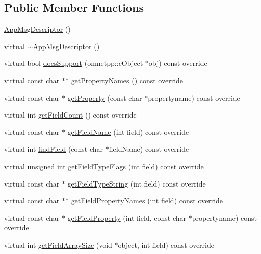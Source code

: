 \subsection*{Public Member Functions}
\begin{DoxyCompactItemize}
\item 
\hyperlink{classAppMsgDescriptor_a6db2ddcf43396f5c9f97311e757e3b51}{App\+Msg\+Descriptor} ()
\item 
virtual \hyperlink{classAppMsgDescriptor_ab164a07b536b9fba949565b8717dc502}{$\sim$\+App\+Msg\+Descriptor} ()
\item 
virtual bool \hyperlink{classAppMsgDescriptor_a46278424168df1b1c695931d232903aa}{does\+Support} (omnetpp\+::c\+Object $\ast$obj) const override
\item 
virtual const char $\ast$$\ast$ \hyperlink{classAppMsgDescriptor_a463f64b1782fbb94c24696f35b3e3060}{get\+Property\+Names} () const override
\item 
virtual const char $\ast$ \hyperlink{classAppMsgDescriptor_a3aeec901180fe34d706eb995bba59e7d}{get\+Property} (const char $\ast$propertyname) const override
\item 
virtual int \hyperlink{classAppMsgDescriptor_a3f448baccbb92d3da8d5026c660a8457}{get\+Field\+Count} () const override
\item 
virtual const char $\ast$ \hyperlink{classAppMsgDescriptor_a65c09ea4375fe8dd56084e1801adbbcd}{get\+Field\+Name} (int field) const override
\item 
virtual int \hyperlink{classAppMsgDescriptor_aeb69344c912887ff0e64d4e4d5d587ba}{find\+Field} (const char $\ast$field\+Name) const override
\item 
virtual unsigned int \hyperlink{classAppMsgDescriptor_a9b354c043d42e40ffe92ccf17a3b49fa}{get\+Field\+Type\+Flags} (int field) const override
\item 
virtual const char $\ast$ \hyperlink{classAppMsgDescriptor_a332a8a40b5013ad50415638e7f0b4ddf}{get\+Field\+Type\+String} (int field) const override
\item 
virtual const char $\ast$$\ast$ \hyperlink{classAppMsgDescriptor_a9cf3ac7e1dc6b2d7262c89736aa77944}{get\+Field\+Property\+Names} (int field) const override
\item 
virtual const char $\ast$ \hyperlink{classAppMsgDescriptor_ae7df10b5c7668b06b562cab7fc5c6e27}{get\+Field\+Property} (int field, const char $\ast$propertyname) const override
\item 
virtual int \hyperlink{classAppMsgDescriptor_a5461c8b2212d7f2060de56ba67c3138e}{get\+Field\+Array\+Size} (void $\ast$object, int field) const override

\end{DoxyCompactItemize}
